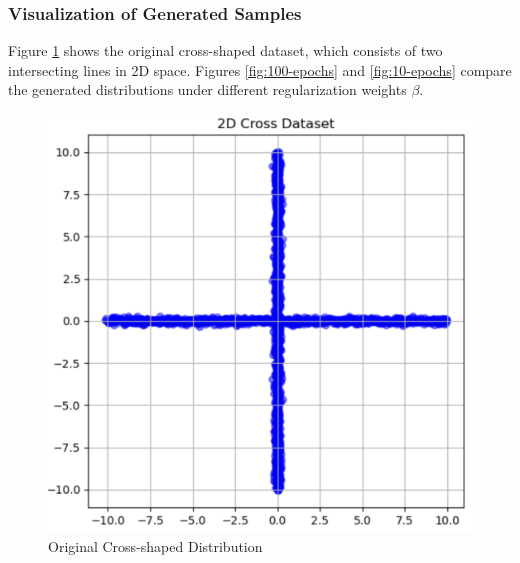 \documentclass[lettersize,journal]{IEEEtran}
\begin{document}
\subsubsection{Visualization of Generated Samples}  
Figure \ref{fig:cross-distribution} shows the original cross-shaped dataset, which consists of two intersecting lines in 2D space. Figures \ref{fig:100-epochs} and \ref{fig:10-epochs} compare the generated distributions under different regularization weights \( \beta \).

\begin{figure}[!ht]
    \centering
    \includegraphics[width=0.55\linewidth]{figures/cross_original.png}
    \caption{Original Cross-shaped Distribution}
    \label{fig:cross-distribution}
\end{figure}
\end{document}
